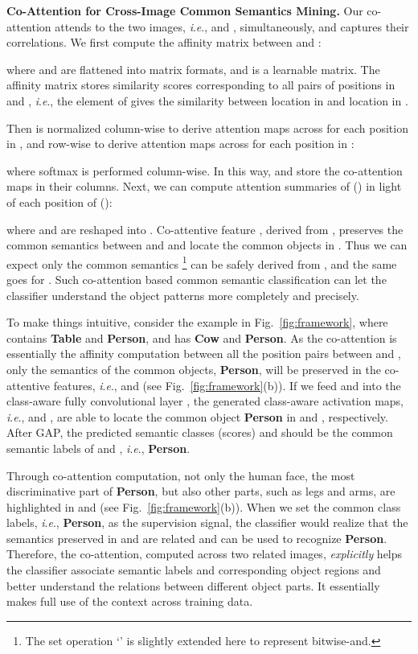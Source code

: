 \documentclass[runningheads]{llncs}
\newcommand{\ie}{\textit{i}.\textit{e}.}
\begin{document}
\noindent\textbf{Co-Attention for Cross-Image Common Semantics Mining.} Our co-attention attends to the two images, \ie,  and , simultaneously, and captures their correlations. We first compute the affinity matrix  between  and :
\vspace{-1pt}

where  and  are flattened into matrix formats, and  is a learnable matrix. The affinity matrix  stores similarity scores corresponding to all pairs of positions in  and , \ie, the  element of  gives the similarity between  location in  and  location in .

Then  is normalized column-wise to derive attention maps across  for each position in , and row-wise to derive attention maps across  for each position in :
\vspace{-1pt}

where softmax is performed column-wise.
In this way,  and  store the co-attention maps in their columns.
Next, we can compute attention summaries of  () in light of each position of  ():
\vspace{-1pt}

where  and  are reshaped into . Co-attentive feature , derived from , preserves the common semantics between  and  and locate the common objects in . Thus we can expect only the common semantics  \footnote{The set operation `' is slightly extended here to represent bitwise-and.} can be safely derived from , and  the same goes for . Such co-attention based common semantic classification can let the classifier understand the object patterns more completely and precisely.

To make things intuitive, consider the example in Fig.~\ref{fig:framework}, where  contains \textbf{Table} and \textbf{Person}, and  has \textbf{Cow} and \textbf{Person}.   As the co-attention is essentially the affinity computation between all the position pairs between  and , only the semantics of the common objects, \textbf{Person}, will be preserved in the co-attentive features, \ie,  and  (see Fig.~\ref{fig:framework}(b)). If we feed  and  into the class-aware fully convolutional layer , the generated class-aware activation maps, \ie,  and , are able to locate the common object \textbf{Person} in  and , respectively. After GAP, the predicted semantic classes (scores)  and  should be the common semantic labels  of  and , \ie, \textbf{Person}.

Through co-attention computation, not only the human face, the most discriminative part of \textbf{Person}, but also other parts, such as legs and arms, are highlighted
in  and  (see Fig.~\ref{fig:framework}(b)). When we set the common class labels, \ie, \textbf{Person}, as the supervision signal, the classifier would realize that the semantics preserved in  and  are related and can be used to recognize \textbf{Person}.  Therefore, the co-attention, computed across two related images, \textit{explicitly} helps the classifier associate semantic labels and corresponding object regions and better understand the relations between different object parts. It essentially makes full use of the context across training data.
\end{document}
